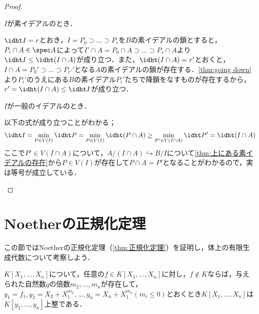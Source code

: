 \begin{proof}
	\begin{step}
		\item $I$が素イデアルのとき．
		
		$\idht I=r$とおき，$I=P_0\supset\dots\supset P_r$を$B$の素イデアルの鎖とすると，$P_i\cap A\in\spec A$によって$I'\cap A=P_0\cap A\supset\dots\supset P_r\cap A$より$\idht I\leq \idht (I\cap A)$が成り立つ．また，$\idht (I\cap A)=r'$とおくと，$I\cap A=P_0'\supset\dots\supset P_{r'}'$となる$A$の素イデアルの鎖が存在する．\ref{thm:going down}より$P_i'$のうえにある$B$の素イデアル$P_i'$たちで降鎖をなすものが存在するから，$r'=\idht(I\cap A)\leq\idht I$が成り立つ．
		
		\item $I$が一般のイデアルのとき．
		
		以下の式が成り立つことがわかる；
		\[\idht I=\min_{P\in V(I)}\idht P=\min_{P\in V(I)}\idht (P\cap A)\geq\min_{P'\in V(I\cap A)}\idht P'=\idht (I\cap A)\]
		ここで$P'\in V(I\cap A)$について，$A/(I\cap A)\hookrightarrow B/I$について\ref{thm:上にある素イデアルの存在}から$P\in V(I)$が存在して$P\cap A=P'$となることがわかるので，実は等号が成立している．
	\end{step}
\end{proof}

\section{Noetherの正規化定理}
この節ではNoetherの正規化定理（\ref{thm:正規化定理}）を証明し，体上の有限生成代数について考察しよう．
%
%
%

\begin{lem}\label{lem:正規化の補題1}
	$K[X_1,\dots,X_n]$について，任意の$f\in K[X_1,\dots,X_n]$に対し，$f\not\in K$ならば，与えられた自然数$q$の倍数$m_2,\dots,m_n$が存在して，$y_1=f_1,y_2=X_2+X_1^{m_2},\dots,y_n=X_n+X_1^{m_n} (m_i\leq0)$とおくとき$K[X_1,\dots,X_n]$は$K[y_1,\dots,y_n]$上整である．
\end{lem}

